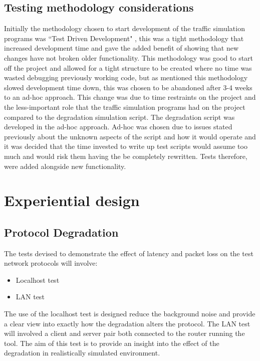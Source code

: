 \subsection{Testing methodology considerations}
Initially the methodology chosen to start development of the traffic simulation programs was ``Test Driven Development" \citep{beck2003test}, this was a tight methodology that increased development time and gave the added benefit of showing that new changes have not broken older functionality. This methodology was good to start off the project and allowed for a tight structure to be created where no time was wasted debugging previously working code, but as mentioned this methodology slowed development time down, this was chosen to be abandoned after 3-4 weeks to an ad-hoc approach. 
This change was due to time restraints on the project and the less-important role that the traffic simulation programs had on the project compared to the degradation simulation script. The degradation script was developed in the ad-hoc approach. Ad-hoc was chosen due to issues stated previously about the unknown aspects of the script and how it would operate and it was decided that the time invested to write up test scripts would assume too much and would risk them having the be completely rewritten. Tests therefore, were added alongside new functionality.





%
\section{Experiential design}

\subsection{Protocol Degradation}
The tests devised to demonstrate the effect of latency and packet loss on the test network protocols will involve: 

\begin{itemize}
	\item Localhost test
	\item LAN test
\end{itemize}

The use of the localhost test is designed reduce the background noise and provide a clear view into exactly how the degradation alters the protocol. The LAN test will involved a client and server pair both connected to the router running the tool. The aim of this test is to provide an insight into the effect of the degradation in realistically simulated environment.

